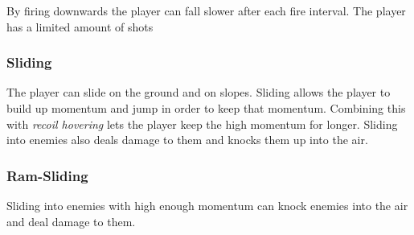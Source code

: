 \documentclass[../Main.tex]{subfiles}
\begin{document}
By firing downwards the player can fall slower after each fire interval. The player has a limited amount of shots 

\subsubsection{Sliding}

The player can slide on the ground and on slopes. Sliding allows the player to build up momentum and jump in order to keep that momentum. Combining this with \emph{recoil hovering} lets the player keep the high momentum for longer. Sliding into enemies also deals damage to them and knocks them up into the air. 

\subsubsection{Ram-Sliding}

Sliding into enemies with high enough momentum can knock enemies into the air and deal damage to them. 
\end{document}
